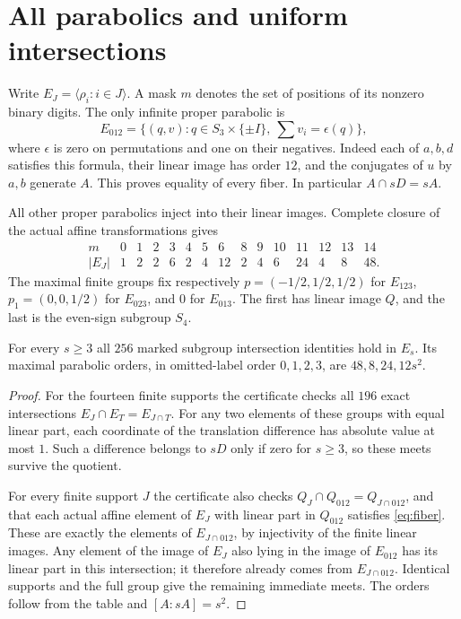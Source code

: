 \section{All parabolics and uniform intersections}
Write $E_J=\langle\rho_i:i\in J\rangle$. A mask $m$ denotes the set of
positions of its nonzero binary digits. The only infinite proper
parabolic is
\begin{equation}\label{eq:fiber}
 E_{012}=\{(q,v):q\in S_3\times\{\pm I\},\ \sum v_i=\epsilon(q)\},
\end{equation}
where $\epsilon$ is zero on permutations and one on their negatives.
Indeed each of $a,b,d$ satisfies this formula, their linear image has
order $12$, and the conjugates of $u$ by $a,b$ generate $A$. This proves
equality of every fiber. In particular $A\cap sD=sA$.

All other proper parabolics inject into their linear images. Complete
closure of the actual affine transformations gives
\[
\begin{array}{c|rrrrrrrrrrrrrr}
m&0&1&2&3&4&5&6&8&9&10&11&12&13&14\\\hline
|E_J|&1&2&2&6&2&4&12&2&4&6&24&4&8&48 .
\end{array}
\]
The maximal finite groups fix respectively $p=(-1/2,1/2,1/2)$ for
$E_{123}$, $p_1=(0,0,1/2)$ for $E_{023}$, and $0$ for $E_{013}$.
The first has linear image $Q$, and the last is the even-sign subgroup
$S_4$.
\begin{proposition}\label{prop:IP}
For every $s\ge3$ all $256$ marked subgroup intersection identities hold
in $E_s$. Its maximal parabolic orders, in omitted-label order $0,1,2,3$,
are $48,8,24,12s^2$.
\end{proposition}
\begin{proof}
For the fourteen finite supports the certificate checks all $196$ exact
intersections $E_J\cap E_T=E_{J\cap T}$. For any two elements of these
groups with equal linear part, each coordinate of the translation
difference has absolute value at most $1$. Such a difference belongs to
$sD$ only if zero for $s\ge3$, so these meets survive the quotient.

For every finite support $J$ the certificate also checks
$Q_J\cap Q_{012}=Q_{J\cap012}$, and that each actual affine element of
$E_J$ with linear part in $Q_{012}$ satisfies \eqref{eq:fiber}.
These are exactly the elements of $E_{J\cap012}$, by injectivity of the
finite linear images. Any element of the image of $E_J$ also lying in
the image of $E_{012}$ has its linear part in this intersection; it
therefore already comes from $E_{J\cap012}$. Identical supports and the
full group give the remaining immediate meets. The orders follow from
the table and $[A:sA]=s^2$.
\end{proof}

